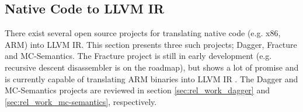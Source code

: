 
\subsection{Native Code to LLVM IR}
\label{sec:rel_work_native_code_to_llvm_ir}

There exist several open source projects for translating native code (e.g. x86, ARM) into LLVM IR. This section presents three such projects; Dagger, Fracture and MC-Semantics. The Fracture project is still in early development (e.g. recursive descent disassembler is on the roadmap), but shows a lot of promise and is currently capable of translating ARM binaries into LLVM IR \cite{fracture}. The Dagger and MC-Semantics projects are reviewed in section \ref{sec:rel_work_dagger} and \ref{sec:rel_work_mc-semantics}, respectively.




